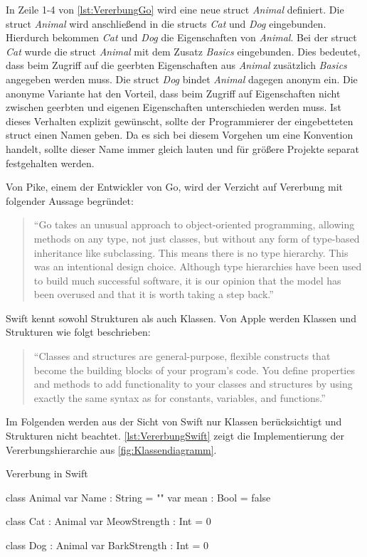 In Zeile 1-4 von \autoref{lst:VererbungGo} wird eine neue struct \emph{Animal} definiert.
Die struct \emph{Animal} wird anschließend in die structs \emph{Cat} und \emph{Dog} eingebunden. 
Hierdurch bekommen \emph{Cat} und \emph{Dog} die Eigenschaften von \emph{Animal}.
Bei der struct \emph{Cat} wurde die struct \emph{Animal} mit dem Zusatz \emph{Basics} eingebunden. 
Dies bedeutet, dass beim Zugriff auf die geerbten Eigenschaften aus \emph{Animal} zusätzlich \emph{Basics} angegeben werden muss. 
Die struct \emph{Dog} bindet \emph{Animal} dagegen anonym ein. 
Die anonyme Variante hat den Vorteil, dass beim Zugriff auf Eigenschaften nicht zwischen geerbten und eigenen Eigenschaften unterschieden werden muss.
Ist dieses Verhalten explizit gewünscht, sollte der Programmierer der eingebetteten struct einen Namen geben.
Da es sich bei diesem Vorgehen um eine Konvention handelt, sollte dieser Name immer gleich lauten und für größere Projekte separat festgehalten werden. 

Von Pike, einem der Entwickler von Go, wird der Verzicht auf Vererbung mit folgender Aussage begründet:
\begin{quote}
\enquote{Go takes an unusual approach to object-oriented programming, allowing methods on any type, not just classes, but without any form of type-based inheritance like subclassing. This means there is no type hierarchy. This was an intentional design choice. Although type hierarchies have been used to build much successful software, it is our opinion that the model has been overused and that it is worth taking a step back.}\cite[]{RobPike.2012}
\end{quote}

Swift kennt sowohl Strukturen als auch Klassen. Von Apple werden Klassen und Strukturen wie folgt beschrieben:
\begin{quote}
\enquote{Classes and structures are general-purpose, flexible constructs that become the building blocks of your program’s code. You define properties and methods to add functionality to your classes and
structures by using exactly the same syntax as for constants, variables, and functions.} \cite[S.183]{Apple.2017}
\end{quote}

Im Folgenden werden aus der Sicht von Swift nur Klassen berücksichtigt und Strukturen nicht beachtet.
\autoref{lst:VererbungSwift} zeigt die Implementierung der Vererbungshierarchie aus \autoref{fig:Klassendiagramm}.

\begin{listing}[H]
\caption{Vererbung in Swift}
\label{lst:VererbungSwift}
\begin{SwiftCode}
class Animal{
    var Name : String = ""
    var mean : Bool = false
}

class Cat : Animal{
    var MeowStrength : Int = 0
}

class Dog : Animal{
    var BarkStrength : Int = 0
}
\end{SwiftCode}
\end{listing}

